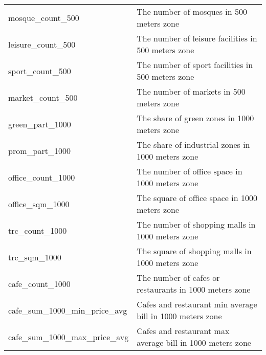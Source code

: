 \begin{longtable}[c]{ll}
    mosque\_count\_500                         & The number of mosques in 500 meters zone                                                                                  \\
    leisure\_count\_500                        & The number of leisure facilities in 500 meters zone                                                                       \\
    sport\_count\_500                          & The number of sport facilities in 500 meters zone                                                                         \\
    market\_count\_500                         & The number of markets in 500 meters zone                                                                                  \\
    green\_part\_1000                          & The share of green zones in 1000 meters zone                                                                              \\
    prom\_part\_1000                           & The share of industrial zones in 1000 meters zone                                                                         \\
    office\_count\_1000                        & The number of office space in 1000 meters zone                                                                            \\
    office\_sqm\_1000                          & The square of office space in 1000 meters zone                                                                            \\
    trc\_count\_1000                           & The number of shopping malls in 1000 meters zone                                                                          \\
    trc\_sqm\_1000                             & The square of shopping malls in 1000 meters zone                                                                          \\
    cafe\_count\_1000                          & The number of cafes or restaurants in 1000 meters zone                                                                    \\
    cafe\_sum\_1000\_min\_price\_avg           & Cafes and restaurant min average bill in 1000 meters zone                                                                 \\
    cafe\_sum\_1000\_max\_price\_avg           & Cafes and restaurant max average bill in 1000 meters zone                                                                 \\

\end{longtable}

